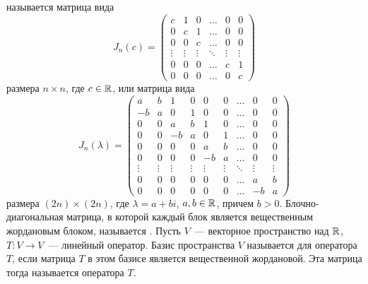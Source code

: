 \begin{definition}
 называется
матрица вида
$$
J_n(c)=
\begin{pmatrix}
c & 1 & 0 & \dots & 0 & 0 \\
0 & c & 1 & \dots & 0 & 0 \\
0 & 0 & c & \dots & 0 & 0 \\
\vdots & \vdots & \vdots & \ddots & \vdots & \vdots \\
0 & 0 & 0 & \dots & c & 1 \\
0 & 0 & 0 & \dots & 0 & c
\end{pmatrix}
$$
размера $n\times n$, где $c\in\mathbb R$, или матрица вида
$$
J_n(\lambda)=
\begin{pmatrix}
 a & b &  1 & 0 &  0 & 0 & \dots & 0 & 0\\
-b & a &  0 & 1 &  0 & 0 & \dots & 0 & 0\\
 0 & 0 &  a & b &  1 & 0 & \dots & 0 & 0\\
 0 & 0 & -b & a &  0 & 1 & \dots & 0 & 0\\
 0 & 0 &  0 & 0 &  a & b & \dots & 0 & 0\\
 0 & 0 &  0 & 0 & -b & a & \dots & 0 & 0\\
\vdots&\vdots&\vdots&\vdots&\vdots&\vdots&\ddots&\vdots&\vdots\\
 0 & 0 &  0 & 0 &  0 & 0 & \dots & a & b\\
 0 & 0 &  0 & 0 &  0 & 0 & \dots & -b & a
\end{pmatrix}
$$
размера $(2n)\times(2n)$, где $\lambda = a+bi$, $a,b\in\mathbb R$, причем $b>0$.
Блочно-диагональная матрица, в которой каждый блок является
вещественным жордановым блоком,
называется .
Пусть $V$~--- векторное пространство над $\mathbb R$,
$T\colon V\to V$~--- линейный оператор. Базис пространства $V$ называется
 для оператора $T$, если матрица
$T$ в этом базисе является вещественной жордановой. Эта матрица
тогда называется  оператора $T$.
\end{definition}

